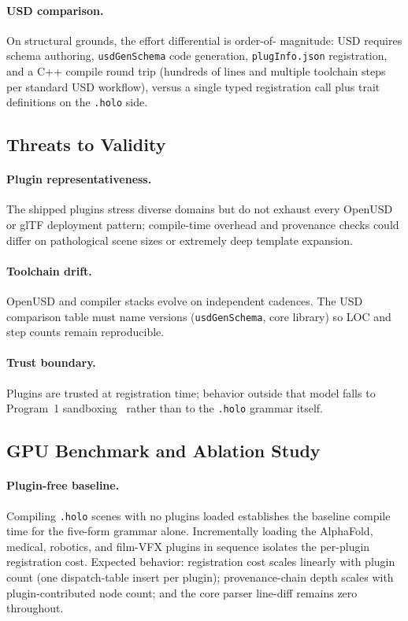 \documentclass[sigconf,nonacm]{acmart}
\newcommand{\holo}{\texttt{.holo}}
\begin{document}
\paragraph{USD comparison.}
On structural grounds, the effort differential is order-of-
magnitude: USD requires schema authoring, \texttt{usdGenSchema} code
generation, \texttt{plugInfo.json} registration, and a C++ compile
round trip (hundreds of lines and multiple toolchain steps per standard
USD workflow), versus a single typed registration call plus trait
definitions on the \holo{} side.

\subsection{Threats to Validity}
\label{sec:threats}

\paragraph{Plugin representativeness.}
The shipped plugins stress diverse domains but do not exhaust every
OpenUSD or glTF deployment pattern; compile-time overhead and provenance
checks could differ on pathological scene sizes or extremely deep template
expansion.

\paragraph{Toolchain drift.}
OpenUSD and compiler stacks evolve on independent cadences. The USD
comparison table must name versions (\texttt{usdGenSchema}, core library)
so LOC and step counts remain reproducible.

\paragraph{Trust boundary.}
Plugins are trusted at registration time; behavior outside that model falls
to Program~1 sandboxing~\cite{paper-4-sandbox-usenix} rather than to the
\holo{} grammar itself.


\subsection{GPU Benchmark and Ablation Study}
\label{sec:ablation}

\paragraph{Plugin-free baseline.}
Compiling \holo{} scenes with no plugins loaded establishes the
baseline compile time for the five-form grammar alone.
Incrementally loading the AlphaFold, medical, robotics, and
film-VFX plugins in sequence isolates the per-plugin registration
cost. Expected behavior: registration cost scales linearly with
plugin count (one dispatch-table insert per plugin); provenance-chain
depth scales with plugin-contributed node count; and the core parser
line-diff remains zero throughout.
\end{document}
